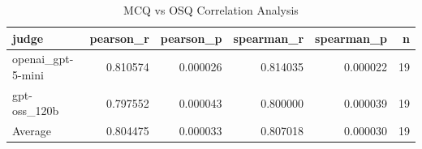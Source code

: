 \begin{table}
\caption{MCQ vs OSQ Correlation Analysis}
\label{tab:mcq_osq_corr}
\begin{tabular}{lrrrrr}
\toprule
judge & pearson_r & pearson_p & spearman_r & spearman_p & n \\
\midrule
openai_gpt-5-mini & 0.810574 & 0.000026 & 0.814035 & 0.000022 & 19 \\
gpt-oss_120b & 0.797552 & 0.000043 & 0.800000 & 0.000039 & 19 \\
Average & 0.804475 & 0.000033 & 0.807018 & 0.000030 & 19 \\
\bottomrule
\end{tabular}
\end{table}
